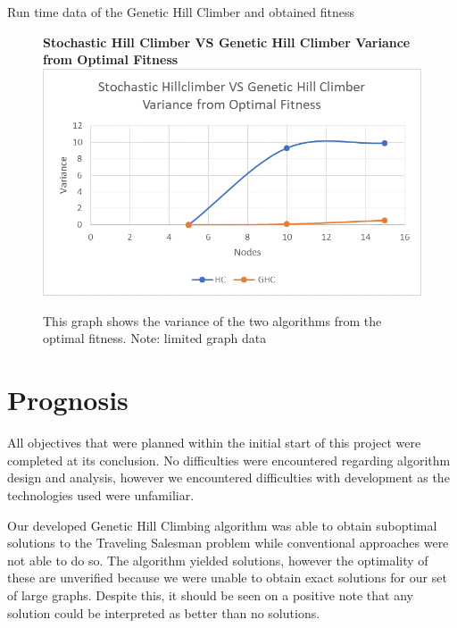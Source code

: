 \documentclass[sigplan,screen]{acmart}
\begin{document}
\begin{table}[h]
    \centering
    
    \caption{Run time data of the Genetic Hill Climber and obtained fitness}
    \label{table:ghc_table}
\end{table}

\begin{figure}[h]
    \centering
    \textbf{Stochastic Hill Climber VS Genetic Hill Climber Variance from Optimal Fitness}
    \includegraphics[width=\columnwidth]{assets/hc_vs_ghc_variance.png}
    \caption{This graph shows the variance of the two algorithms from the optimal fitness. Note: limited graph data}
    \label{fig:variance}
\end{figure}

\clearpage
\section{Prognosis}
All objectives that were planned within the initial start of this project were
completed at its conclusion. No difficulties were encountered regarding
algorithm design and analysis, however we encountered difficulties with
development as the technologies used were unfamiliar.

Our developed Genetic Hill Climbing algorithm was able to obtain suboptimal
solutions to the Traveling Salesman problem while conventional approaches were
not able to do so. The algorithm yielded solutions, however the optimality of
these are unverified because we were unable to obtain exact solutions for our
set of large graphs. Despite this, it should be seen on a positive note that any
solution could be interpreted as better than no solutions.
\end{document}

